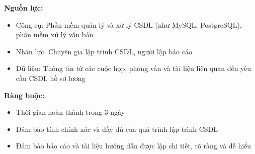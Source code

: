 {\begin{minipage}{\textwidth}
    \noindent \textbf{Nguồn lực:}
    \begin{itemize}
        \item Công cụ: Phần mềm quản lý và xử lý CSDL (như MySQL, PostgreSQL), phần mềm xử lý văn bản
        \item Nhân lực: Chuyên gia lập trình CSDL, người lập báo cáo
        \item Dữ liệu: Thông tin từ các cuộc họp, phỏng vấn và tài liệu liên quan đến yêu cầu CSDL hồ sơ lương
    \end{itemize}
    \noindent \textbf{Ràng buộc:}
    \begin{itemize}
        \item Thời gian hoàn thành trong 3 ngày
        \item Đảm bảo tính chính xác và đầy đủ của quá trình lập trình CSDL
        \item Đảm bảo báo cáo và tài liệu hướng dẫn được lập chi tiết, rõ ràng và dễ hiểu
    \end{itemize}
    \end{minipage}
}
\newpage
{}    
